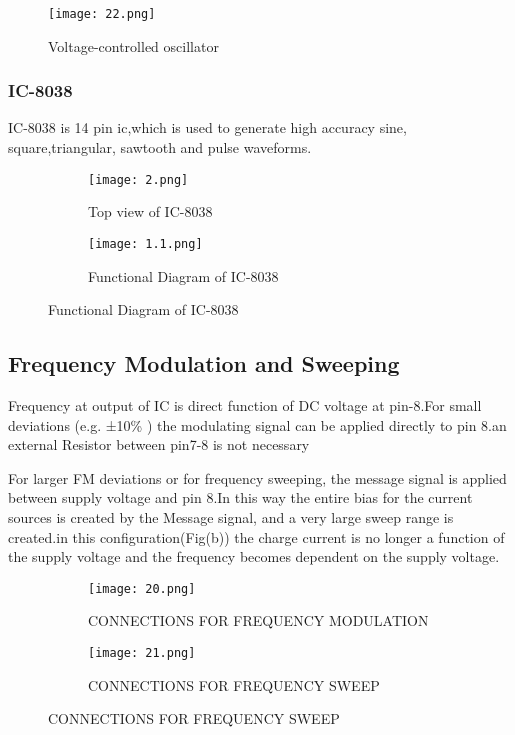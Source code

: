 \documentclass{article}
\begin{document}
\begin{figure*}[h]
	\centering
	\texttt{[image: 22.png]}
	\caption{Voltage-controlled oscillator}
	\label{FBD}
\end{figure*}




\subsubsection{IC-8038}
IC-8038 is 14 pin ic,which is used to generate  high accuracy sine, square,triangular, sawtooth and pulse waveforms.\par

\begin{figure}[ht]
  \begin{subfigure}[b]{0.5\textwidth}
    \texttt{[image: 2.png]}
    \caption{Top view of IC-8038}
    \label{fig:1}
  \end{subfigure}
  \begin{subfigure}[b]{0.5\textwidth}
    \texttt{[image: 1.1.png]}
    \caption{Functional Diagram of IC-8038}
    \label{fig:2}
  \end{subfigure}
\end{figure}

\subsection{Frequency Modulation and Sweeping}
Frequency at output of IC is direct function of DC voltage at pin-8.For small deviations (e.g. ±10\% ) the modulating signal can be applied directly to pin 8.an external Resistor between pin7-8 is not necessary\par
For larger FM deviations or for frequency sweeping, the message signal is applied between supply voltage and pin 8.In this way the entire bias for the current sources is created by the Message signal, and a very large  sweep range is created.in this configuration(Fig(b)) the charge current is no longer a function of the supply voltage and the frequency becomes dependent on the supply voltage.
\begin{figure}[ht]
  \begin{subfigure}[b]{0.4\textwidth}
    \texttt{[image: 20.png]}
    \caption{CONNECTIONS FOR FREQUENCY MODULATION}
    \label{fig:1}
  \end{subfigure}
  \begin{subfigure}[b]{0.4\textwidth}
    \texttt{[image: 21.png]}
    \caption{CONNECTIONS FOR FREQUENCY SWEEP}
    \label{fig:2}
  \end{subfigure}
\end{figure}
\end{document}
